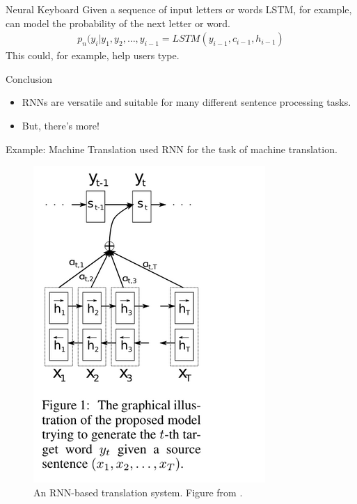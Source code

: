 \documentclass{beamer}
\begin{document}
    \begin{frame}{Neural Keyboard}
      Given a sequence of input letters or words LSTM, for example, can model
      the probability of the next letter or word.
      \begin{align}
        p_n(y_i| y_1, y_2, \dots , y_{i-1} = LSTM(y_{i-1}, c_{i-1}, h_{i-1})
      \end{align}
      This could, for example, help users type.
    \end{frame}

    \begin{frame}{Conclusion}
      \begin{itemize}
        \item RNNs are versatile and suitable for many different sentence processing tasks.
        \item But, there's more!
      \end{itemize}
    \end{frame}

    \begin{frame}{Example: Machine Translation}
      \cite{Bahdanau2015NeuralMT} used RNN for the task of machine translation.
      \begin{figure}
      \includegraphics[scale=0.3]{./figures/translation.png}
      \caption{An RNN-based translation system. Figure from \cite{Bahdanau2015NeuralMT}.}
      \end{figure}
    \end{frame}
\end{document}
